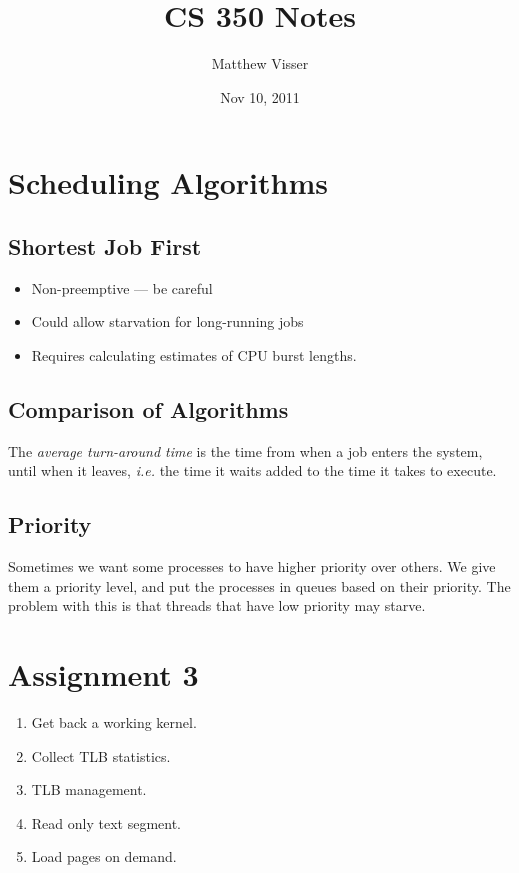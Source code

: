 \documentclass[12pt]{article}
\begin{document}
\title{CS 350 Notes}
\author{Matthew Visser}
\date{Nov 10, 2011}
\maketitle

\section{Scheduling Algorithms}

\subsection{Shortest Job First}

\begin{itemize}
	\item Non-preemptive --- be careful
	\item Could allow starvation for long-running jobs
	\item Requires calculating estimates of CPU burst lengths.
\end{itemize}


\subsection{Comparison of Algorithms}

The \emph{average turn-around time} is the time from when a job enters the
system, until when it leaves, \textit{i.e.} the time it waits added to the time
it takes to execute.

\subsection{Priority}

Sometimes we want some processes to have higher priority over others. We give
them a priority level, and put the processes in queues based on their priority.
The problem with this is that threads that have low priority may starve.

\section{Assignment 3}

\begin{enumerate}
	\item Get back a working kernel.
	\item Collect TLB statistics.
	\item TLB management.
	\item Read only text segment.
	\item Load pages on demand.
\end{enumerate}
\end{document}
